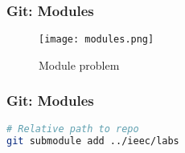 \begin{frame}

\frametitle{Git: Modules}

\begin{figure}
\centering
\texttt{[image: modules.png]}
\caption{Module problem}
\label{fig:tagging-1}

\end{figure}

\end{frame}

\begin{frame}[fragile]

\frametitle{Git: Modules}

\begin{lstlisting}[language=Bash]
# Relative path to repo
git submodule add ../ieec/labs
\end{lstlisting}


\end{frame}
